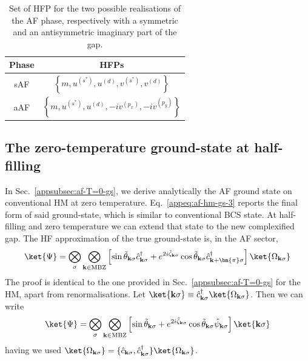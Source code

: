\begin{table}
	\centering
	\begin{tabular}{c c}
		\textbf{Phase} & \textbf{HFPs} \\
		\midrule
		sAF & $\left\lbrace 
		m, u^{(s^*)}, u^{(d)}, v^{(s^*)}, v^{(d)}
		\right\rbrace$ \\[0.7em]
		aAF & $\left\lbrace
		m, u^{(s^*)}, u^{(d)}, -iv^{(p_x)}, -iv^{(p_y)}
		\right\rbrace$ \\
		\midrule
	\end{tabular}
	\caption{Set of HFP for the two possible realisations of the AF phase, respectively with a symmetric and an antisymmetric imaginary part of the gap.}
	\label{tab:af-saf-aaf-hfps}
\end{table}

\subsection{The zero-temperature ground-state at half-filling}\label{subsec:af-gs}

In Sec.~\ref{appsubsec:af-T=0-gs}, we derive analytically the AF ground state on conventional HM at zero temperature. Eq.~\eqref{appeq:af-hm-gs-3} reports the final form of said ground-state, which is similar to conventional BCS state. At half-filling and zero temperature we can extend that state to the new complexified gap. The HF approximation of the true ground-state is, in the AF sector,
\begin{equation}\label{eq:af-hm-gs}
	\ket{\Psi} = \bigotimes_\sigma \bigotimes_{\mathbf{k}\in\mathrm{MBZ}} \left[
	\sin\tilde{\theta}_{\mathbf{k}\sigma} \hat c_{\mathbf{k}\sigma}^\dagger + e^{2i\tilde{\zeta}_{\mathbf{k}\sigma}} \cos \tilde{\theta}_{\mathbf{k}\sigma} \hat c_{\mathbf{k}+\bm{\pi}\sigma}^\dagger
	\right] \ket{\Omega_{\mathbf{k}\sigma}}
\end{equation}
The proof is identical to the one provided in Sec.~\ref{appsubsec:af-T=0-gs} for the HM, apart from renormalisations. Let $\ket{\mathbf{k}\sigma} \equiv \hat c_{\mathbf{k}\sigma}^\dagger \ket{\Omega_{\mathbf{k}\sigma}}$. Then we can write
\[
\ket{\Psi} = \bigotimes_\sigma \bigotimes_{\mathbf{k}\in\mathrm{MBZ}} \left[
\sin\tilde{\theta}_{\mathbf{k}\sigma} + e^{2i\tilde{\zeta}_{\mathbf{k}\sigma}} \cos \tilde{\theta}_{\mathbf{k}\sigma} \hat \psi_{\mathbf{k}\sigma}
\right] \ket{\mathbf{k}\sigma}
\]
having we used $\ket{\Omega_{\mathbf{k}\sigma}} = \lbrace \hat c_{\mathbf{k}\sigma}, \hat c_{\mathbf{k}\sigma}^\dagger \rbrace \ket{\Omega_{\mathbf{k}\sigma}}$.


